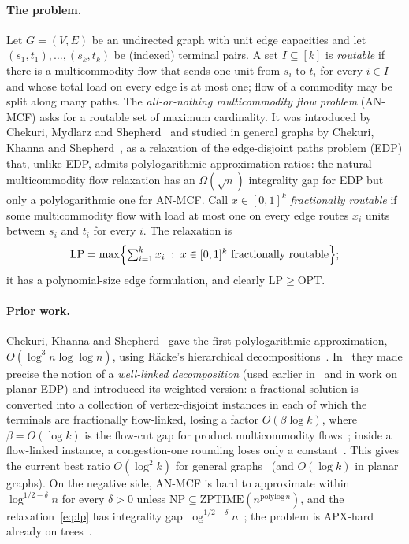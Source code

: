\documentclass[11pt,letterpaper]{article}
\theoremstyle{definition}
\newcommand{\LP}{\mathrm{LP}}
\newcommand{\OPT}{\mathrm{OPT}}
\begin{document}
\paragraph{The problem.}
Let $G=(V,E)$ be an undirected graph with unit edge capacities and let
$(s_1,t_1),\dots,(s_k,t_k)$ be (indexed) terminal pairs. A set $I\subseteq[k]$ is
\emph{routable} if there is a multicommodity flow that sends one unit from $s_i$ to $t_i$ for
every $i\in I$ and whose total load on every edge is at most one; flow of a commodity may be
split along many paths. The \emph{all-or-nothing multicommodity flow problem} (AN-MCF) asks
for a routable set of maximum cardinality. It was introduced by Chekuri, Mydlarz and
Shepherd~\cite{CMS07} and studied in general graphs by Chekuri, Khanna and
Shepherd~\cite{CKS04,CKS13}, as a relaxation of the edge-disjoint paths problem (EDP) that,
unlike EDP, admits polylogarithmic approximation ratios: the natural multicommodity flow
relaxation has an $\Omega(\sqrt n)$ integrality gap for EDP but only a polylogarithmic one for
AN-MCF. Call $x\in[0,1]^k$ \emph{fractionally routable} if some multicommodity flow with load
at most one on every edge routes $x_i$ units between $s_i$ and $t_i$ for every $i$. The
relaxation is
\begin{equation}\label{eq:lp}
\LP=\max\Bigl\{\textstyle\sum_{i=1}^k x_i\;:\;x\in[0,1]^k\text{ fractionally routable}\Bigr\};
\end{equation}
it has a polynomial-size edge formulation, and clearly $\LP\ge\OPT$.

\paragraph{Prior work.}
Chekuri, Khanna and Shepherd~\cite{CKS04,CKS13} gave the first polylogarithmic
approximation, $O(\log^3 n\log\log n)$, using R\"acke's hierarchical
decompositions~\cite{Racke02,HHR03}. In~\cite{CKS05} they made precise the notion of a
\emph{well-linked decomposition} (used earlier in~\cite{CKS04} and in work on planar EDP) and
introduced its weighted version: a fractional solution is converted into a collection of
vertex-disjoint instances in each of which the terminals are fractionally flow-linked, losing
a factor $O(\beta\log k)$, where $\beta=O(\log k)$ is the flow-cut gap for product
multicommodity flows~\cite{LR99,LLR95,AR98}; inside a flow-linked instance, a congestion-one
rounding loses only a constant~\cite[Theorem~3.1]{CKS05}. This gives the current best ratio
$O(\log^2 k)$ for general graphs~\cite[Theorem~3.2]{CKS05} (and $O(\log k)$ in planar graphs).
On the negative side, AN-MCF is hard to approximate within $\log^{1/2-\delta}n$ for every
$\delta>0$ unless $\mathrm{NP}\subseteq\mathrm{ZPTIME}(n^{\mathrm{polylog}\, n})$, and the
relaxation~\eqref{eq:lp} has integrality gap $\log^{1/2-\delta}n$~\cite{ACGKTZ10}; the problem is
APX-hard already on trees~\cite{GVY97}.
\end{document}
